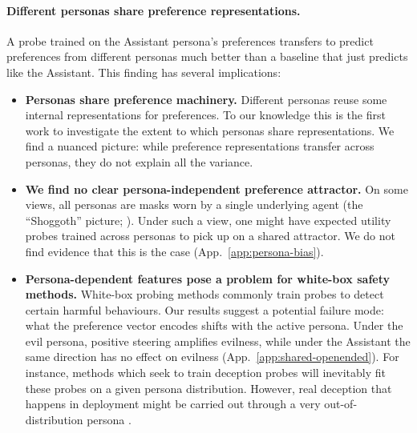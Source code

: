 \documentclass{article}
\begin{document}
\paragraph{Different personas share preference representations.}
A probe trained on the Assistant persona's preferences transfers to predict preferences from different personas much better than a baseline that just predicts like the Assistant. This finding has several implications:
\begin{itemize}
\item \textbf{Personas share preference machinery.} Different personas reuse some internal representations for preferences. To our knowledge this is the first work to investigate the extent to which personas share representations. We find a nuanced picture: while preference representations transfer across personas, they do not explain all the variance.
\item \textbf{We find no clear persona-independent preference attractor.} On some views, all personas are masks worn by a single underlying agent (the ``Shoggoth'' picture; \citealp{janus2022simulators, marks2026personaselection}). Under such a view, one might have expected utility probes trained across personas to pick up on a shared attractor. We do not find evidence that this is the case (App.~\ref{app:persona-bias}). 
\item \textbf{Persona-dependent features pose a problem for white-box safety methods.} White-box probing methods commonly train probes to detect certain harmful behaviours. Our results suggest a potential failure mode: what the preference vector encodes shifts with the active persona. Under the evil persona, positive steering amplifies evilness, while under the Assistant the same direction has no effect on evilness (App.~\ref{app:shared-openended}). For instance, methods which seek to train deception probes will inevitably fit these probes on a given persona distribution. However, real deception that happens in deployment might be carried out through a very out-of-distribution persona \citep{goldowskydill2025deception, haralambiev2026probesfanatics}.
\end{itemize}
\end{document}
